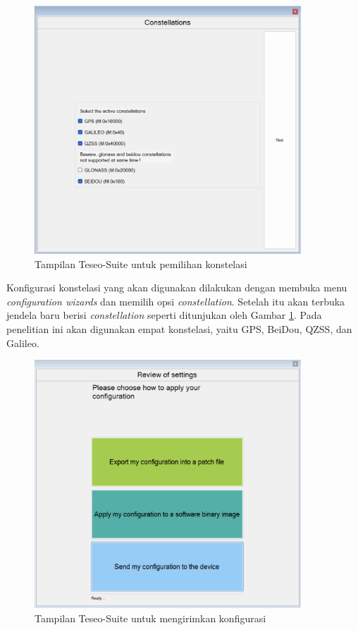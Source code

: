  \begin{figure}[H]
	\centering
	\includegraphics[width=10cm]{contents/chapter-3/setting-konstelasi/pilih-konfigurasi.png}
	\caption{Tampilan Teseo-Suite untuk pemilihan konstelasi}
	\label{Fig: pilih-konstelasi}
\end{figure}

Konfigurasi konstelasi yang akan digunakan dilakukan dengan membuka menu \textit{configuration wizards} dan memilih opsi \textit{constellation}. Setelah itu akan terbuka jendela baru berisi \textit{constellation} seperti ditunjukan oleh Gambar \ref{Fig: pilih-konstelasi}. Pada penelitian ini akan digunakan empat konstelasi, yaitu GPS, BeiDou, QZSS, dan Galileo.

\begin{figure}[H]
	\centering
	\includegraphics[width=10cm]{contents/chapter-3/setting-konstelasi/kirim-konfigurasi.png}
	\caption{Tampilan Teseo-Suite untuk mengirimkan konfigurasi}
	\label{Fig: kirim-konstelasi}
\end{figure}

